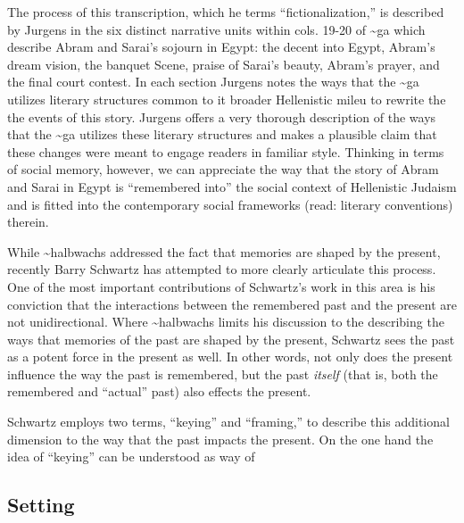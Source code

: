 The process of this transcription, which he terms ``fictionalization,''
is described by Jurgens in the six distinct narrative units within cols.
19-20 of \textasciitilde{}ga which describe Abram and Sarai's sojourn in
Egypt: the decent into Egypt, Abram's dream vision, the banquet Scene,
praise of Sarai's beauty, Abram's prayer, and the final court contest.
In each section Jurgens notes the ways that the \textasciitilde{}ga
utilizes literary structures common to it broader Hellenistic mileu to
rewrite the the events of this story. Jurgens offers a very thorough
description of the ways that the \textasciitilde{}ga utilizes these
literary structures and makes a plausible claim that these changes were
meant to engage readers in familiar style. Thinking in terms of social
memory, however, we can appreciate the way that the story of Abram and
Sarai in Egypt is ``remembered into'' the social context of Hellenistic
Judaism and is fitted into the contemporary social frameworks (read:
literary conventions) therein.

While \textasciitilde{}halbwachs addressed the fact that memories are
shaped by the present, recently Barry Schwartz has attempted to more
clearly articulate this process. One of the most important contributions
of Schwartz's work in this area is his conviction that the interactions
between the remembered past and the present are not unidirectional.
Where \textasciitilde{}halbwachs limits his discussion to the describing
the ways that memories of the past are shaped by the present, Schwartz
sees the past as a potent force in the present as well. In other words,
not only does the present influence the way the past is remembered, but
the past \emph{itself} (that is, both the remembered and ``actual''
past) also effects the present.

Schwartz employs two terms, ``keying'' and ``framing,'' to describe this
additional dimension to the way that the past impacts the present. On
the one hand the idea of ``keying'' can be understood as way of

\hypertarget{setting}{%
\subsection{Setting}\label{setting}}

